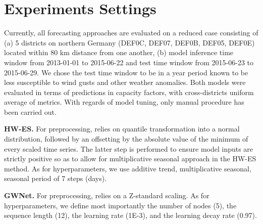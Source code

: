 \chapter{Experiments Settings}

Currently, all forecasting approaches are evaluated on a reduced case consisting of (a) 5 districts on northern Germany (DEF0C, DEF07, DEF0B, DEF05, DEF0E) located within 80 km distance from one another, (b) model inference time window from 2013-01-01 to 2015-06-22 and test time window from 2015-06-23 to 2015-06-29. We chose the test time window to be in a year period known to be less susceptible to wind gusts and other weather anomalies. Both models were evaluated in terms of predictions in capacity factors, with cross-districts uniform average of metrics. With regards of model tuning, only manual procedure has been carried out.

\vspace{1em}
\noindent
\textbf{HW-ES.} For preprocessing, relies on quantile transformation into a normal distribution, followed by an offsetting by the absolute value of the minimum of every scaled time series. The latter step is performed to ensure model inputs are strictly positive so as to allow for multiplicative seasonal approach in the HW-ES method. As for hyperparameters, we use additive trend, multiplicative seasonal, seasonal period of 7 steps (days).

\vspace{1em}
\noindent
\textbf{GWNet.} For preprocessing, relies on a Z-standard scaling. As for hyperparameters, we define most importantly the number of nodes (5), the sequence length (12), the learning rate (1E-3), and the learning decay rate (0.97).
